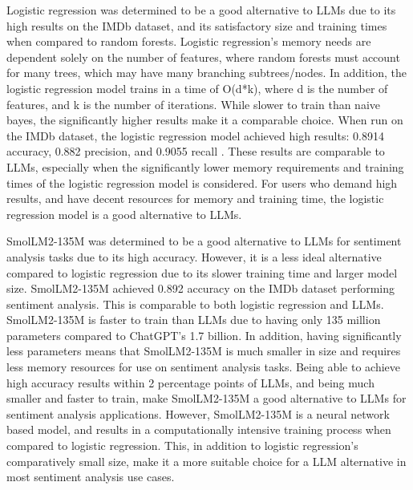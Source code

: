 \documentclass[10pt,twocolumn,letterpaper]{article}
\begin{document}
Logistic regression was determined to be a good alternative to LLMs due to its high results on the IMDb dataset, and its satisfactory size and training times when compared to random forests. Logistic regression’s memory needs are dependent solely on the number of features, where random forests must account for many trees, which may have many branching subtrees/nodes. In addition, the  logistic regression model trains in a time of O(d*k), where d is the number of features, and k is the number of iterations. While slower to train than naive bayes, the significantly higher results make it a comparable choice. When run on the IMDb dataset, the logistic regression model achieved high results: 0.8914 accuracy, 0.882 precision, and 0.9055 recall \cite{MLTechniques}. These results are comparable to LLMs, especially when the significantly lower memory requirements and training times of the logistic regression model is considered. For users who demand high results, and have decent resources for memory and training time, the logistic regression model is a good alternative to LLMs.

SmolLM2-135M was determined to be a good alternative to LLMs for sentiment analysis tasks due to its high accuracy. However, it is a less ideal alternative compared to logistic regression due to its slower training time and larger model size. SmolLM2-135M achieved 0.892 accuracy on the IMDb dataset performing sentiment analysis. This is comparable to both logistic regression and LLMs. SmolLM2-135M is faster to train than LLMs due to having only 135 million parameters compared to ChatGPT’s 1.7 billion. In addition, having significantly less parameters means that SmolLM2-135M is much smaller in size and requires less memory resources for use on sentiment analysis tasks. Being able to achieve high accuracy results within 2 percentage points of LLMs, and being much smaller and faster to train, make SmolLM2-135M a good alternative to LLMs for sentiment analysis applications. However, SmolLM2-135M is a neural network based model, and results in a computationally intensive training process when compared to logistic regression. This, in addition to logistic regression’s comparatively small size, make it a more suitable choice for a LLM alternative in most sentiment analysis use cases. 
\end{document}
